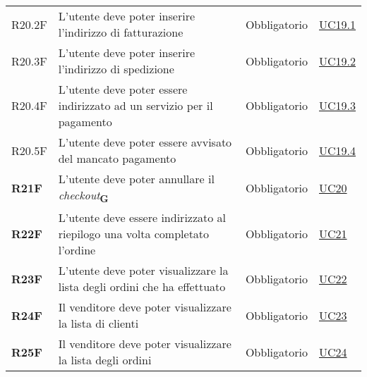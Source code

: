 \begin{center}
\begin{longtable}[!h]{p{50px} p{245px} p{75px} p{50px}}
        R20.2F                                & L'utente deve poter inserire l'indirizzo di fatturazione                                                                           & Obbligatorio             & \hyperref[sec:UC19.1]{UC19.1}                \\
        R20.3F                                & L'utente deve poter inserire l'indirizzo di spedizione                                                                             & Obbligatorio             & \hyperref[sec:UC19.2]{UC19.2}                \\
        R20.4F                                & L'utente deve poter essere indirizzato ad un servizio per il pagamento                                                             & Obbligatorio             & \hyperref[sec:UC19.3]{UC19.3}                \\
        R20.5F                                & L'utente deve poter essere avvisato del mancato pagamento                                                                          & Obbligatorio             & \hyperref[sec:UC19.4]{UC19.4}                \\
        \textbf{R21F}                         & L'utente deve poter annullare il \textit{checkout}\textsubscript{\textbf{G}}                                                       & Obbligatorio             & \hyperref[sec:UC20]{UC20}                    \\
        \textbf{R22F}                         & L'utente deve essere indirizzato al riepilogo una volta completato l'ordine                                                        & Obbligatorio             & \hyperref[sec:UC21]{UC21}                    \\
        \textbf{R23F}                         & L'utente deve poter visualizzare la lista degli ordini che ha effettuato                                                           & Obbligatorio             & \hyperref[sec:UC22]{UC22}                    \\
        \textbf{R24F}                         & Il venditore deve poter visualizzare la lista di clienti                                                                           & Obbligatorio             & \hyperref[sec:UC23]{UC23}                    \\
        \textbf{R25F}                         & Il venditore deve poter visualizzare la lista degli ordini                                                                         & Obbligatorio             & \hyperref[sec:UC24]{UC24}                    \\

\end{longtable}
\end{center}
